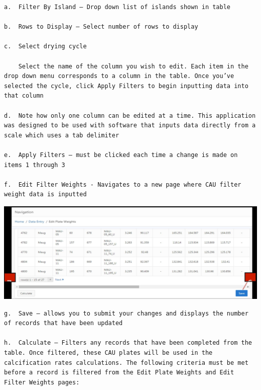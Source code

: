 \documentclass[]{book}
\begin{document}
\begin{verbatim}
a.  Filter By Island – Drop down list of islands shown in table  

b.  Rows to Display – Select number of rows to display  

c.  Select drying cycle  

    Select the name of the column you wish to edit. Each item in the drop down menu corresponds to a column in the table. Once you’ve selected the cycle, click Apply Filters to begin inputting data into that column  

d.  Note how only one column can be edited at a time. This application was designed to be used with software that inputs data directly from a scale which uses a tab delimiter  

e.  Apply Filters – must be clicked each time a change is made on items 1 through 3  

f.  Edit Filter Weights - Navigates to a new page where CAU filter weight data is inputted  
\end{verbatim}

\includegraphics{images/Data4.jpg}

\begin{verbatim}
g.  Save – allows you to submit your changes and displays the number of records that have been updated  

h.  Calculate – Filters any records that have been completed from the table. Once filtered, these CAU plates will be used in the calcification rates calculations. The following criteria must be met before a record is filtered from the Edit Plate Weights and Edit Filter Weights pages:
\end{verbatim}
\end{document}
